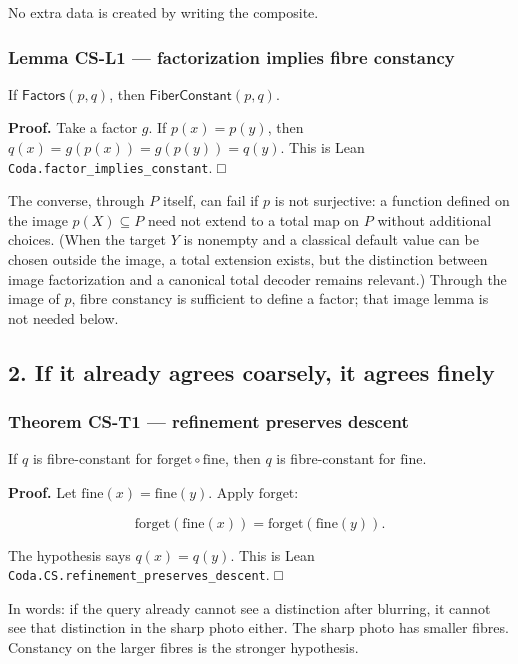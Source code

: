 \documentclass[
  11pt,
]{article}
\begin{document}
No extra data is created by writing the composite.

\subsubsection{Lemma CS-L1 --- factorization implies fibre constancy}\label{lemma-cs-l1-factorization-implies-fibre-constancy}

If \(\mathsf{Factors}(p,q)\), then \(\mathsf{FiberConstant}(p,q)\).

\textbf{Proof.} Take a factor \(g\). If \(p(x)=p(y)\), then \(q(x)=g(p(x))=g(p(y))=q(y)\). This is Lean \nolinkurl{Coda.factor_implies_constant}. □

The converse, through \(P\) itself, can fail if \(p\) is not surjective: a function defined on the image \(p(X)\subseteq P\) need not extend to a total map on \(P\) without additional choices. (When the target \(Y\) is nonempty and a classical default value can be chosen outside the image, a total extension exists, but the distinction between image factorization and a canonical total decoder remains relevant.) Through the image of \(p\), fibre constancy is sufficient to define a factor; that image lemma is not needed below.

\subsection{2. If it already agrees coarsely, it agrees finely}\label{if-it-already-agrees-coarsely-it-agrees-finely}

\subsubsection{Theorem CS-T1 --- refinement preserves descent}\label{theorem-cs-t1-refinement-preserves-descent}

If \(q\) is fibre-constant for \(\mathrm{forget}\circ\mathrm{fine}\), then \(q\) is fibre-constant for \(\mathrm{fine}\).

\textbf{Proof.} Let \(\mathrm{fine}(x)=\mathrm{fine}(y)\). Apply \(\mathrm{forget}\):

\[
\mathrm{forget}(\mathrm{fine}(x))=\mathrm{forget}(\mathrm{fine}(y)).
\]

The hypothesis says \(q(x)=q(y)\). This is Lean \nolinkurl{Coda.CS.refinement_preserves_descent}. □

In words: if the query already cannot see a distinction after blurring, it cannot see that distinction in the sharp photo either. The sharp photo has smaller fibres. Constancy on the larger fibres is the stronger hypothesis.
\end{document}
